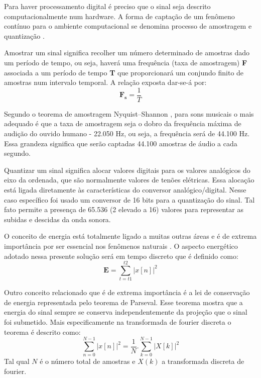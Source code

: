 Para haver processamento digital é preciso que o sinal seja descrito computacionalmente num hardware. A forma de captação de um fenômeno contínuo para o ambiente computacional se denomina processo de amostragem e quantização \cite{amostragem}.

Amostrar um sinal significa recolher um número determinado de amostras dado um período de tempo, ou seja, haverá uma frequência (taxa de amostragem) \textbf{F} associada a um período de tempo \textbf{T} que proporcionará um conjundo finito de amostras num intervalo temporal. A relação exposta dar-se-á por:
\begin{equation}
\label{eqn05}
	\mathbf{F_s} = \frac{1}{T}
\end{equation}

Segundo o teorema de amostragem Nyquist–Shannon \cite{Nyquist}, para sons musicais o mais adequado é que a taxa de amostragem seja o dobro da frequência máxima de audição do ouvido humano - 22.050 Hz, ou seja, a frequência será de 44.100 Hz. Essa grandeza significa que serão captadas 44.100 amostras de áudio a cada segundo.

Quantizar um sinal significa alocar valores digitais para os valores analógicos do eixo da ordenada, que são normalmente valores de tenões elétricas. Essa alocação está ligada diretamente às características do conversor analógico/digital. Nesse caso específico foi usado um conversor de 16 bits para a quantização do sinal. Tal fato permite a presença de 65.536 (2 elevado a 16) valores para representar as subidas e descidas da onda sonora.

O conceito de energia está totalmente ligado a muitas outras áreas e é de extrema importância por ser essencial nos fenômenos naturais \cite{oppenheim}. O aspecto energético adotado nessa presente solução será em tempo discreto que é definido como:
\begin{equation}
\label{eqn07}
	\mathbf{E} = \sum_{t=t1}^{t2}{|x[n]|^{2}}
\end{equation}

Outro conceito relacionado que é de extrema importância é a lei de conservação de energia representada pelo teorema de Parseval. Esse teorema mostra que a energia do sinal sempre se conserva independentemente da projeção que o sinal foi submetido. Mais especificamente na transformada de fourier discreta o teorema é descrito como:
\begin{equation}
\label{eqn09}
	\sum_{n=0}^{N - 1}{|x[n]|^{2}} =  \frac{1}{N}.\sum_{k=0}^{N - 1}{|X[k]|^{2}}
\end{equation}
Tal qual $N$ é o número total de amostras e $X(k)$ a transformada discreta de fourier.

